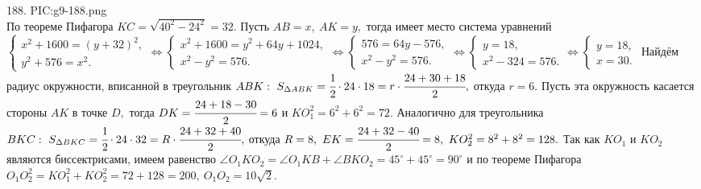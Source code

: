 188. {{PIC:g9-188.png}}\\
По теореме Пифагора $KC=\sqrt{40^2-24^2}=32.$ Пусть $AB=x,\ AK=y,$ тогда имеет место система уравнений $\begin{cases}x^2+1600=(y+32)^2,\\
y^2+576=x^2.\end{cases}\Leftrightarrow\begin{cases}x^2+1600=y^2+64y+1024,\\
x^2-y^2=576.\end{cases}\Leftrightarrow\begin{cases}576=64y-576,\\
x^2-y^2=576.\end{cases}\Leftrightarrow\begin{cases}y=18,\\
x^2-324=576.\end{cases}\Leftrightarrow\begin{cases}y=18,\\
x=30.\end{cases}$ Найдём радиус окружности, вписанной в треугольник $ABK:\ S_{\Delta ABK}=\cfrac{1}{2}\cdot24\cdot18=r\cdot\cfrac{24+30+18}{2},$ откуда $r=6.$ Пусть эта окружность касается стороны $AK$ в точке $D,$ тогда $DK=\cfrac{24+18-30}{2}=6$ и $KO_1^2=6^2+6^2=72.$ Аналогично для треугольника $BKC:\ S_{\Delta BKC}=\cfrac{1}{2}\cdot24\cdot32=R\cdot\cfrac{24+32+40}{2},$ откуда $R=8,\ EK=\cfrac{24+32-40}{2}=8,\ KO_2^2=8^2+8^2=128.$ Так как $KO_1$ и $KO_2$ являются биссектрисами, имеем равенство $\angle O_1KO_2=\angle O_1KB+\angle BKO_2=45^\circ+45^\circ=90^\circ$ и по теореме Пифагора $O_1O_2^2=KO_1^2+KO_2^2=72+128=200,\ O_1O_2=10\sqrt{2}.$\\
